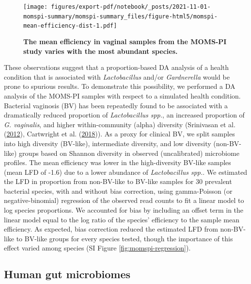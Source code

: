 \documentclass[
]{article}
\begin{document}
\begin{figure}
\centering
\texttt{[image: figures/export-pdf/notebook/\_posts/2021-11-01-momspi-summary/momspi-summary\_files/figure-html5/momspi-mean-efficiency-dist-1.pdf]}
\caption{\label{fig:momspi-mean-efficiency-dist}\textbf{The mean efficiency in vaginal samples from the MOMS-PI study varies with the most abundant species.}}
\end{figure}



These observations suggest that a proportion-based DA analysis of a health condition that is associated with \emph{Lactobacillus} and/or \emph{Gardnerella} would be prone to spurious results.
To demonstrate this possibility, we performed a DA analysis of the MOMS-PI samples with respect to a simulated health condition.
Bacterial vaginosis (BV) has been repeatedly found to be associated with a dramatically reduced proportion of \emph{Lactobacillus spp.}, an increased proportion of \emph{G. vaginalis}, and higher within-community (alpha) diversity (Srinivasan et al. (\protect\hyperlink{ref-srinivasan2012bact}{2012}), Cartwright et al. (\protect\hyperlink{ref-cartwright2018mult}{2018})).
As a proxy for clinical BV, we split samples into high diversity (BV-like), intermediate diversity, and low diversity (non-BV-like) groups based on Shannon diversity in observed (uncalibrated) microbiome profiles.
The mean efficiency was lower in the high-diversity BV-like samples (mean LFD of -1.6) due to a lower abundance of \emph{Lactobacillus spp.}.
We estimated the LFD in proportion from non-BV-like to BV-like samples for 30 prevalent bacterial species, with and without bias correction, using gamma-Poisson (or negative-binomial) regression of the observed read counts to fit a linear model to log species proportions.
We accounted for bias by including an offset term in the linear model equal to the log ratio of the species' efficiency to the sample mean efficiency.
As expected, bias correction reduced the estimated LFD from non-BV-like to BV-like groups for every species tested, though the importance of this effect varied among species (SI Figure \ref{fig:momspi-regression}).

\hypertarget{human-gut-microbiomes}{%
\subsection{Human gut microbiomes}\label{human-gut-microbiomes}}
\end{document}
